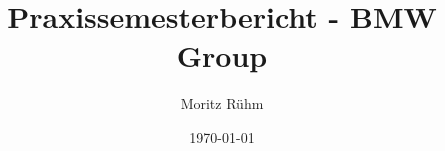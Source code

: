 \newcommand{\fullname}{Moritz Rühm}
\newcommand{\email}{Moritz.Ruehm@stud.hs-mannheim.de}
\newcommand{\matnr}{2121907}
\newcommand{\hochschule}{Technische Hochschule Mannheim}
\newcommand{\fakultaet}{Informatik}
\newcommand{\studiengang}{Unternehmens- und Wirtschaftsinformatik}

\newcommand{\titel}{Praxissemesterbericht}
\newcommand{\unternehmen}{BMW Group}

\newcommand{\von}{31.03.2025}
\newcommand{\bis}{26.08.2025}

\newcommand{\abgabedatum}{xx.xx.2025}


\title{Praxissemesterbericht - \unternehmen}
\author{\fullname}
\date{\today}